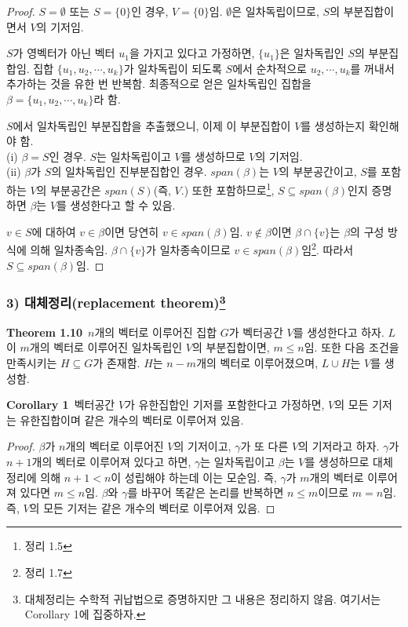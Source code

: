 \begin{proof}
$S=\emptyset$ 또는 $S=\{0\}$인 경우, $V=\{0\}$임. $\emptyset$은 일차독립이므로, $S$의 부분집합이면서 $V$의 기저임.

$S$가 영벡터가 아닌 벡터 $u_1$을 가지고 있다고 가정하면, $\{u_1\}$은 일차독립인 $S$의 부분집합임. 집합 $\{u_1,u_2, \cdots ,u_k\}$가 일차독립이 되도록 $S$에서 순차적으로 $u_2, \cdots ,u_k$를 꺼내서 추가하는 것을 유한 번 반복함. 최종적으로 얻은 일차독립인 집합을 $\beta = \{u_1,u_2, \cdots ,u_k\}$라 함.

$S$에서 일차독립인 부분집합을 추출했으니, 이제 이 부분집합이 $V$를 생성하는지 확인해야 함.\\
(i) $\beta = S$인 경우. $S$는 일차독립이고 $V$를 생성하므로 $V$의 기저임.\\
(ii) $\beta$가 $S$의 일차독립인 진부분집합인 경우. $span(\beta)$는 $V$의 부분공간이고, $S$를 포함하는 $V$의 부분공간은 $span(S)$(즉, $V$.) 또한 포함하므로\footnote{정리 1.5}, $S \subseteq span(\beta)$인지 증명하면 $\beta$는 $V$를 생성한다고 할 수 있음.

$v \in S$에 대하여 $v \in \beta$이면 당연히 $v \in span(\beta)$임. $v \notin \beta$이면 $\beta \cap \{v\}$는 $\beta$의 구성 방식에 의해 일차종속임. $\beta \cap \{v\}$가 일차종속이므로 $v \in span(\beta)$임\footnote{정리 1.7}. 따라서 $S \subseteq span(\beta)$임.
\end{proof}

\subsubsection*{3) 대체정리(replacement theorem)\footnote{대체정리는 수학적 귀납법으로 증명하지만 그 내용은 정리하지 않음. 여기서는 Corollary 1에 집중하자.}}
\textbf{Theorem 1.10}\, $n$개의 벡터로 이루어진 집합 $G$가 벡터공간 $V$를 생성한다고 하자. $L$이 $m$개의 벡터로 이루어진 일차독립인 $V$의 부분집합이면, $m \leq n$임. 또한 다음 조건을 만족시키는 $H \subseteq G$가 존재함. $H$는 $n-m$개의 벡터로 이루어졌으며, $L \cup H$는 $V$를 생성함.

\textbf{Corollary 1}\, 벡터공간 $V$가 유한집합인 기저를 포함한다고 가정하면, $V$의 모든 기저는 유한집합이며 같은 개수의 벡터로 이루어져 있음.

\begin{proof}
$\beta$가 $n$개의 벡터로 이루어진 $V$의 기저이고, $\gamma$가 또 다른 $V$의 기저라고 하자. $\gamma$가 $n+1$개의 벡터로 이루어져 있다고 하면, $\gamma$는 일차독립이고 $\beta$는 $V$를 생성하므로 대체정리에 의해 $n+1 < n$이 성립해야 하는데 이는 모순임. 즉, $\gamma$가 $m$개의 벡터로 이루어져 있다면 $m \leq n$임. $\beta$와 $\gamma$를 바꾸어 똑같은 논리를 반복하면 $n \leq m$이므로 $m=n$임. 즉, $V$의 모든 기저는 같은 개수의 벡터로 이루어져 있음.
\end{proof}

